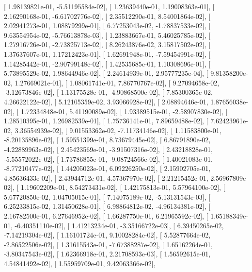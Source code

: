 \documentclass{article}
\begin{document}
       [  1.98139821e-01,  -5.51195584e-02],
       [  1.23639440e-01,   1.19008363e-01],
       [  2.16290168e-01,  -6.61702776e-02],
       [  2.35512290e-01,   8.54001864e-02],
       [  2.02941273e-01,   1.08879299e-01],
       [  6.77253043e-02,  -1.78837533e-02],
       [  9.63554954e-02,  -5.76613878e-03],
       [  1.23883667e-01,   5.46025785e-02],
       [  1.27916726e-01,  -2.73825713e-02],
       [  8.26243876e-02,   3.15817502e-02],
       [  1.37637607e-01,   1.17212423e-01],
       [  1.62691948e-01,  -7.59454991e-02],
       [  1.14285442e-01,  -2.90799148e-02],
       [  1.42535685e-01,   1.10308696e-01],
       [  5.73895529e-02,   1.98644946e-02],
       [  2.24614939e-01,   2.95777235e-04],
       [  9.81358200e-02,   1.27669021e-01],
       [  1.08061741e-01,   7.86770767e-02],
       [  9.27094658e-02,  -3.12673846e-02],
       [  1.13175528e-01,  -4.90868500e-02],
       [  7.85300365e-02,   4.26622122e-02],
       [  5.12105359e-02,   3.93066928e-02],
       [  2.08894646e-01,   1.87656038e-02],
       [  1.72334848e-01,   5.41190089e-02],
       [  1.93389515e-01,  -2.58907830e-02],
       [  1.28510395e-01,   1.26982539e-01],
       [  1.75736141e-01,   7.89659488e-02],
       [  7.62423961e-02,   3.36554939e-02],
       [  9.01553362e-02,  -7.11734146e-02],
       [  1.11583800e-01,  -8.20135896e-02],
       [  1.59551399e-01,   8.73679445e-02],
       [  6.86791890e-02,  -4.22889963e-02],
       [  2.45423569e-01,  -3.91507316e-02],
       [  2.43218828e-01,  -5.55572022e-02],
       [  1.73786855e-01,  -9.08724566e-02],
       [  1.40021083e-01,  -8.77210477e-02],
       [  1.44205023e-01,   6.09226250e-02],
       [  2.15902705e-01,   4.85636433e-02],
       [  2.43944712e-01,   4.57367970e-02],
       [  2.21215452e-01,   2.56967809e-02],
       [  1.19602209e-01,   8.54273431e-02],
       [  1.42175813e-01,   5.57964100e-02],
       [  5.67720850e-02,   1.04705015e-01],
       [  7.14075189e-02,  -5.13131543e-03],
       [  6.25233815e-02,   1.31450628e-01],
       [  6.98864812e-02,  -4.96134381e-02],
       [  2.16782500e-01,   6.27646952e-02],
       [  1.66287750e-01,   6.21965592e-02],
       [  1.65188349e-01,  -6.40351110e-02],
       [  1.41213234e-01,  -3.35166722e-03],
       [  6.39450265e-02,  -7.14219304e-02],
       [  1.16101724e-01,   9.10028284e-02],
       [  5.52877664e-02,  -2.86522506e-02],
       [  1.31615543e-01,  -7.67388287e-02],
       [  1.65162264e-01,  -3.80347543e-02],
       [  1.62366918e-01,   2.21708593e-03],
       [  1.56592615e-01,   4.54841492e-02],
       [  1.55959709e-01,   9.42063366e-02],
\end{document}
